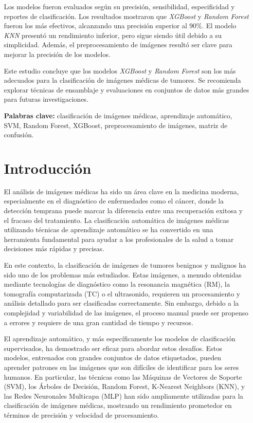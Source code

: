 \documentclass[12pt]{article}
\begin{document}
Los modelos fueron evaluados según su precisión, sensibilidad, especificidad y reportes de clasificación. Los resultados mostraron que \textit{XGBoost} y \textit{Random Forest} fueron los más efectivos, alcanzando una precisión superior al 90\%. El modelo \textit{KNN} presentó un rendimiento inferior, pero sigue siendo útil debido a su simplicidad. Además, el preprocesamiento de imágenes resultó ser clave para mejorar la precisión de los modelos.

Este estudio concluye que los modelos \textit{XGBoost} y \textit{Random Forest} son los más adecuados para la clasificación de imágenes médicas de tumores. Se recomienda explorar técnicas de ensamblaje y evaluaciones en conjuntos de datos más grandes para futuras investigaciones.

\textbf{Palabras clave:} clasificación de imágenes médicas, aprendizaje automático, SVM, Random Forest, XGBoost, preprocesamiento de imágenes, matriz de confusión.

\section{Introducción}
El análisis de imágenes médicas ha sido un área clave en la medicina moderna, especialmente en el diagnóstico de enfermedades como el cáncer, donde la detección temprana puede marcar la diferencia entre una recuperación exitosa y el fracaso del tratamiento. La clasificación automática de imágenes médicas utilizando técnicas de aprendizaje automático se ha convertido en una herramienta fundamental para ayudar a los profesionales de la salud a tomar decisiones más rápidas y precisas.

En este contexto, la clasificación de imágenes de tumores benignos y malignos ha sido uno de los problemas más estudiados. Estas imágenes, a menudo obtenidas mediante tecnologías de diagnóstico como la resonancia magnética (RM), la tomografía computarizada (TC) o el ultrasonido, requieren un procesamiento y análisis detallado para ser clasificadas correctamente. Sin embargo, debido a la complejidad y variabilidad de las imágenes, el proceso manual puede ser propenso a errores y requiere de una gran cantidad de tiempo y recursos.

El aprendizaje automático, y más específicamente los modelos de clasificación supervisados, ha demostrado ser eficaz para abordar estos desafíos. Estos modelos, entrenados con grandes conjuntos de datos etiquetados, pueden aprender patrones en las imágenes que son difíciles de identificar para los seres humanos. En particular, las técnicas como las Máquinas de Vectores de Soporte (SVM), los Árboles de Decisión, Random Forest, K-Nearest Neighbors (KNN), y las Redes Neuronales Multicapa (MLP) han sido ampliamente utilizadas para la clasificación de imágenes médicas, mostrando un rendimiento prometedor en términos de precisión y velocidad de procesamiento.
\end{document}
